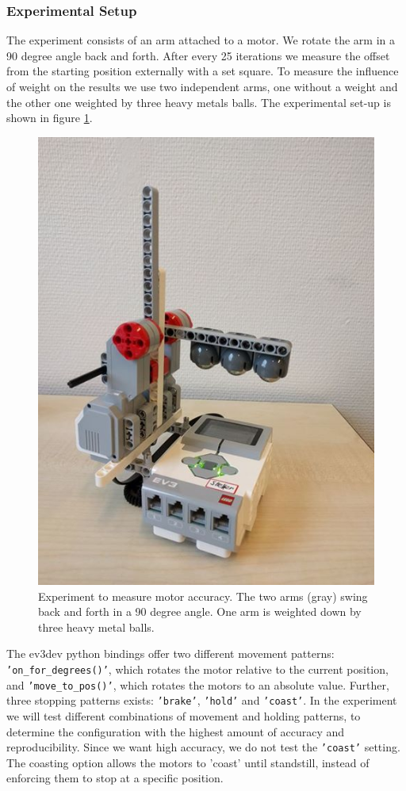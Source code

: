 \documentclass[11pt, a4paper]{article}
\begin{document}
\subsubsection*{Experimental Setup}
The experiment consists of an arm attached to a motor. We rotate the arm in a 90 degree angle back and forth. After every 25 iterations we measure the offset from the starting position externally with a set square. To measure the influence of weight on the results we use two independent arms, one without a weight and the other one weighted by three heavy metals balls. The experimental set-up is shown in figure \ref{fig:angle_experiment}.

\begin{figure}[H]
\centering
\includegraphics[width=0.35\linewidth]{images/angle_experiment}
\caption{Experiment to measure motor accuracy. The two arms (gray) swing back and forth in a 90 degree angle. One arm is weighted down by three heavy metal balls.}
\label{fig:angle_experiment}
\end{figure}



The ev3dev python bindings offer two different movement patterns: \texttt{'on\_for\_degrees()'}, which rotates the motor relative to the current position, and \texttt{'move\_to\_pos()'}, which rotates the motors to an absolute value.  Further, three stopping patterns exists: \texttt{'brake'}, \texttt{'hold'} and \texttt{'coast'}. In the experiment we will test different combinations of movement and holding patterns, to determine the configuration with the highest amount of accuracy and reproducibility. Since we want high accuracy, we do not test the \texttt{'coast'} setting. The coasting option allows the motors to 'coast' until standstill, instead of enforcing them to stop at a specific position. 
\end{document}
